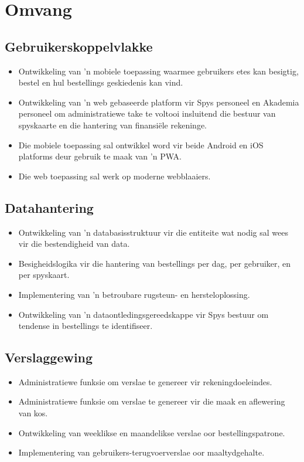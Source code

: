 \section{Omvang}

\subsection{Gebruikerskoppelvlakke}
\begin{itemize}
    \item Ontwikkeling van 'n mobiele toepassing waarmee gebruikers etes kan besigtig, bestel en hul bestellings geskiedenis kan vind.
    \item Ontwikkeling van 'n web gebaseerde platform vir Spys personeel en Akademia personeel om administratiewe take te voltooi insluitend die bestuur van spyskaarte en die hantering van finansiële rekeninge.
    \item Die mobiele toepassing sal ontwikkel word vir beide Android en iOS platforms deur gebruik te maak van 'n \ac{PWA}. 
    \item Die web toepassing sal werk op moderne webblaaiers.
\end{itemize}

\subsection{Datahantering}
\begin{itemize}
    \item Ontwikkeling van 'n databasisstruktuur vir die entiteite wat nodig sal wees vir die bestendigheid van data.
    \item Besigheidslogika vir die hantering van bestellings per dag, per gebruiker, en per spyskaart.
    \item Implementering van 'n betroubare rugsteun- en hersteloplossing.
    \item Ontwikkeling van 'n dataontledingsgereedskappe vir Spys bestuur om tendense in bestellings te identifiseer.
\end{itemize}

\subsection{Verslaggewing}
\begin{itemize}
    \item Administratiewe funksie om verslae te genereer vir rekeningdoeleindes.
    \item Administratiewe funksie om verslae te genereer vir die maak en aflewering van kos.
    \item Ontwikkeling van weeklikse en maandelikse verslae oor bestellingspatrone.
    \item Implementering van gebruikers-terugvoerverslae oor maaltydgehalte.
\end{itemize}

